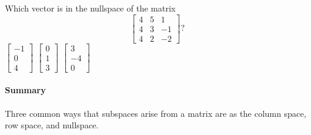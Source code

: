 \begin{activity}
Which vector is in the nullspace of the matrix
\begin{equation*}
\begin{bmatrix} 4&5&1
\\4&3&-1
\\4&2&-2 \end{bmatrix}?
\end{equation*}
{\(\begin{bmatrix} -1\\0\\4 \end{bmatrix}\)}
{\(\begin{bmatrix} 0\\1\\3 \end{bmatrix}\)}
{\(\begin{bmatrix} 3\\-4\\0 \end{bmatrix}\)}
\end{activity}
   


\paragraph{Summary} Three common ways that subspaces arise from a matrix are as the column space, row space, and nullspace.


